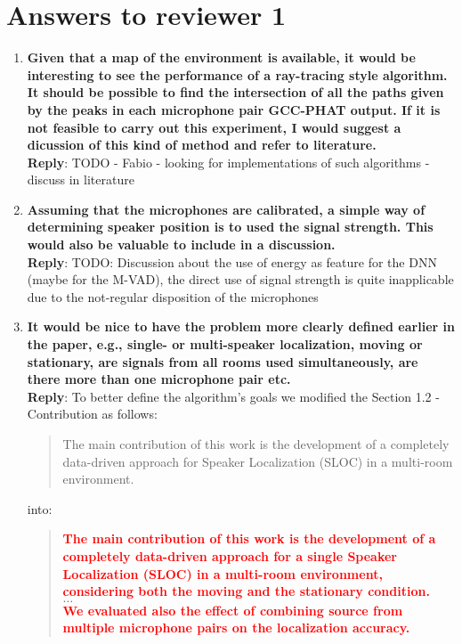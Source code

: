 \documentclass[11pt, technote, letterpaper, oneside, onecolumn]{IEEEtran}
\begin{document}
\section{Answers to reviewer 1}\label{sec:rev1}
\begin{enumerate}
\item \textbf{Given that a map of the environment is available, it would be interesting to see the performance of a ray-tracing style algorithm. It should be possible to find the intersection of all the paths given by the peaks in each microphone pair GCC-PHAT output. If it is not feasible to carry out this experiment, I would suggest a dicussion of this kind of method and refer to literature.\\}
\textbf{Reply}: TODO - Fabio - looking for implementations of such algorithms - discuss in literature

\item \textbf{Assuming that the microphones are calibrated, a simple way of determining speaker position is to used the signal strength. This would also be valuable to include in a discussion.\\}
\textbf{Reply}: TODO: Discussion about the use of energy as feature for the DNN (maybe for the M-VAD), the direct use of signal strength is quite inapplicable due to the not-regular disposition of the microphones

\item \textbf{It would be nice to have the problem more clearly defined earlier in the paper, e.g., single- or multi-speaker localization, moving or stationary, are signals from all rooms used simultaneously, are there more than one microphone pair etc.\\}
\textbf{Reply}: To better define the algorithm's goals we modified the Section 1.2 - Contribution as follows:
	\begin{quote}
		The main contribution of this work is the development of a completely data-driven approach for Speaker Localization (SLOC) in a multi-room environment.
	\end{quote}

into:
	\begin{quote}
		\textcolor{red}{\textbf{The main contribution of this work is the development of a completely data-driven approach for a single Speaker Localization (SLOC) in a multi-room environment, considering both the moving and the stationary condition.}}\\
		$\dots$\\
		\textcolor{red}{\textbf{We evaluated also the effect of combining source from multiple microphone pairs on the localization accuracy.}}		
	\end{quote}
	

\end{enumerate}
\end{document}
